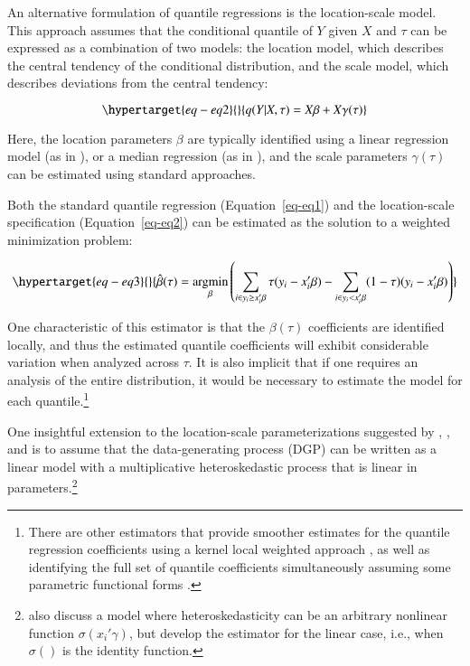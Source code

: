 \documentclass[
  authoryear,
  review,
  1p]{elsarticle}
\begin{document}
An alternative formulation of quantile regressions is the location-scale
model. This approach assumes that the conditional quantile of \(Y\)
given \(X\) and \(\tau\) can be expressed as a combination of two
models: the location model, which describes the central tendency of the
conditional distribution, and the scale model, which describes
deviations from the central tendency:

\begin{equation}\protect\hypertarget{eq-eq2}{}{q(Y|X,\tau) =X\beta+X\gamma(\tau)
}\label{eq-eq2}\end{equation}

Here, the location parameters \(\beta\) are typically identified using a
linear regression model (as in \citet{mss2019}), or a median regression
(as in \citet{melly2005}), and the scale parameters \(\gamma(\tau)\) can
be estimated using standard approaches.

Both the standard quantile regression (Equation~\ref{eq-eq1}) and the
location-scale specification (Equation~\ref{eq-eq2}) can be estimated as
the solution to a weighted minimization problem:

\begin{equation}\protect\hypertarget{eq-eq3}{}{\hat{\beta}(\tau) = \underset{\beta}{\operatorname{argmin}}
\left( \sum_{i\in y_i\geq x_i'\beta} \tau (y_i - x_i'\beta) - \sum_{i\in y_i<x_i'\beta} (1-\tau)(y_i - x_i'\beta) \right)
}\label{eq-eq3}\end{equation}

One characteristic of this estimator is that the \(\beta(\tau)\)
coefficients are identified locally, and thus the estimated quantile
coefficients will exhibit considerable variation when analyzed across
\(\tau\). It is also implicit that if one requires an analysis of the
entire distribution, it would be necessary to estimate the model for
each quantile.\footnote{There are other estimators that provide smoother
  estimates for the quantile regression coefficients using a kernel
  local weighted approach \citep{kaplan2017}, as well as identifying the
  full set of quantile coefficients simultaneously assuming some
  parametric functional forms \citep{frumentobotai2016}.}

One insightful extension to the location-scale parameterizations
suggested by \citet{he1997}, \citet{cameron2005}, and \citet{mss2019} is
to assume that the data-generating process (DGP) can be written as a
linear model with a multiplicative heteroskedastic process that is
linear in parameters.\footnote{\citet{mss2019} also discuss a model
  where heteroskedasticity can be an arbitrary nonlinear function
  \(\sigma(x_i'\gamma)\), but develop the estimator for the linear case,
  i.e., when \(\sigma()\) is the identity function.}
\end{document}
